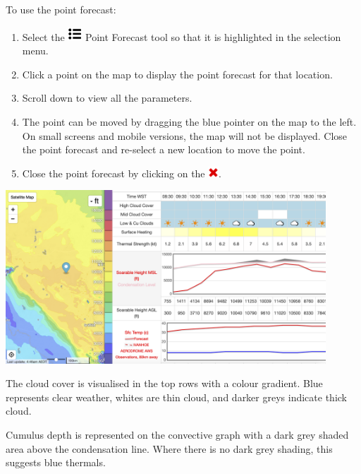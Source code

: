 \documentclass[11pt,a4paper]{article}
\begin{document}
To use the point forecast:
\begin{enumerate}
\item Select the \includegraphics[height=15pt]{images/icons/point_forecast.png} Point Forecast tool so that it is highlighted in the selection menu.
\item Click a point on the map to display the point forecast for that location.
\item Scroll down to view all the parameters.
\item The point can be moved by dragging the blue pointer on the map to the left. On small screens and mobile versions, the map will not be displayed. Close the point forecast and re-select a new location to move the point.
\item Close the point forecast by clicking on the \includegraphics[height=11pt]{images/icons/exit.png}.
\end{enumerate}
\begin{center}
\includegraphics[width=12cm]{images/point_forecast.png}
\end{center}
The cloud cover is visualised in the top rows with a colour gradient. Blue represents clear weather, whites are thin cloud, and darker greys indicate thick cloud.

Cumulus depth is represented on the convective graph with a dark grey shaded area above the condensation line. Where there is no dark grey shading, this suggests blue thermals.
\end{document}
